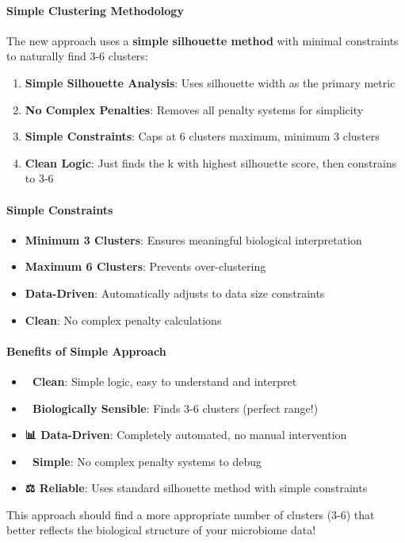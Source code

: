 \documentclass[
]{article}
\providecommand{\tightlist}{%
  \setlength{\itemsep}{0pt}\setlength{\parskip}{0pt}}
\begin{document}
\paragraph{\texorpdfstring{\textbf{Simple Clustering
Methodology}}{Simple Clustering Methodology}}\label{simple-clustering-methodology}

The new approach uses a \textbf{simple silhouette method} with minimal
constraints to naturally find 3-6 clusters:

\begin{enumerate}
\def\labelenumi{\arabic{enumi}.}
\tightlist
\item
  \textbf{Simple Silhouette Analysis}: Uses silhouette width as the
  primary metric
\item
  \textbf{No Complex Penalties}: Removes all penalty systems for
  simplicity
\item
  \textbf{Simple Constraints}: Caps at 6 clusters maximum, minimum 3
  clusters
\item
  \textbf{Clean Logic}: Just finds the k with highest silhouette score,
  then constrains to 3-6
\end{enumerate}

\paragraph{\texorpdfstring{\textbf{Simple
Constraints}}{Simple Constraints}}\label{simple-constraints}

\begin{itemize}
\tightlist
\item
  \textbf{Minimum 3 Clusters}: Ensures meaningful biological
  interpretation
\item
  \textbf{Maximum 6 Clusters}: Prevents over-clustering
\item
  \textbf{Data-Driven}: Automatically adjusts to data size constraints
\item
  \textbf{Clean}: No complex penalty calculations
\end{itemize}

\paragraph{\texorpdfstring{\textbf{Benefits of Simple
Approach}}{Benefits of Simple Approach}}\label{benefits-of-simple-approach}

\begin{itemize}
\tightlist
\item
  \textbf{🎯 Clean}: Simple logic, easy to understand and interpret
\item
  \textbf{🧬 Biologically Sensible}: Finds 3-6 clusters (perfect range!)
\item
  \textbf{📊 Data-Driven}: Completely automated, no manual intervention
\item
  \textbf{🔄 Simple}: No complex penalty systems to debug
\item
  \textbf{⚖️ Reliable}: Uses standard silhouette method with simple
  constraints
\end{itemize}

This approach should find a more appropriate number of clusters (3-6)
that better reflects the biological structure of your microbiome data!
🚀
\end{document}
